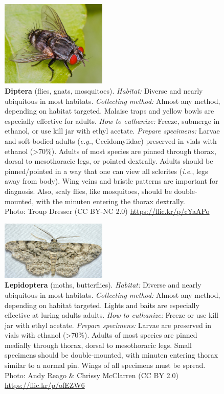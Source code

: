 \documentclass[letterpaper, 11pt]{article}
\begin{document}
\begin{figure}
  \caption*{\textbf{Diptera} (flies, gnats, mosquitoes). \textit{Habitat:} Diverse and nearly ubiquitous in most habitats. \textit{Collecting method:} Almost any method, depending on habitat targeted. Malaise traps and yellow bowls are especially effective for adults. \textit{How to euthanize:} Freeze, submerge in ethanol, or use kill jar with ethyl acetate. \textit{Prepare specimens:} Larvae and soft-bodied adults (\textit{e.g.}, Cecidomyiidae) preserved in vials with ethanol (\textgreater70\%). Adults of most species are pinned through thorax, dorsal to mesothoracic legs, or pointed dextrally. Adults should be pinned/pointed in a way that one can view all sclerites (\textit{i.e.}, legs away from body). Wing veins and bristle patterns are important for diagnosis. Also, scaly flies, like mosquitoes, should be double-mounted, with the minuten entering the thorax dextrally.\\ Photo: Troup Dresser (CC BY-NC 2.0) \url{https://flic.kr/p/cYaAPo}}
  \includegraphics[width=0.45\textwidth]{Diptera}
\end{figure}

\begin{figure}
  \caption*{\textbf{Lepidoptera} (moths, butterflies). \textit{Habitat:} Diverse and nearly ubiquitous in most habitats. \textit{Collecting method:} Almost any method, depending on habitat targeted. Lights and baits are especially effective at luring adults adults. \textit{How to euthanize:} Freeze or use kill jar with ethyl acetate. \textit{Prepare specimens:} Larvae are preserved in vials with ethanol (\textgreater70\%). Adults of most species are pinned medially through thorax, dorsal to mesothoracic legs. Small specimens should be double-mounted, with minuten entering thorax similar to a normal pin. Wings of all specimens must be spread. \\ Photo: Andy Reago \& Chrissy McClarren (CC BY 2.0) \url{https://flic.kr/p/ofEZW6}}
  \includegraphics[width=0.45\textwidth]{Lepidoptera}
\end{figure}
\end{document}
